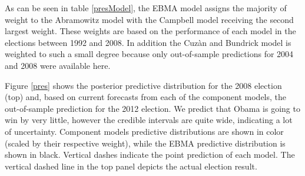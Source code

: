 \documentclass[12pt,fullpage,endnotes]{article}
\begin{document}

As can be seen in table \ref{presModel}, the EBMA model assigns the majority of weight to the Abramowitz model with the Campbell model receiving the second largest weight. These weights are based on the performance of each model in the elections between 1992 and 2008. In addition the Cuz\`an and Bundrick model is weighted to such a small degree because only out-of-sample predictions for 2004 and 2008 were available here.

Figure \ref{pres} shows the posterior predictive distribution for the
2008 election (top) and, based on current forecasts from each of the
component models, the out-of-sample prediction for the 2012 election.  We predict that Obama is going to
win by very little, however the credible intervals are quite wide, indicating a lot of uncertainty. Component models predictive distributions are shown in color (scaled by their respective weight), while the EBMA predictive distribution is shown in black. Vertical dashes indicate the point prediction of each model. The vertical dashed line in the top panel depicts the actual election result. 
\end{document}
